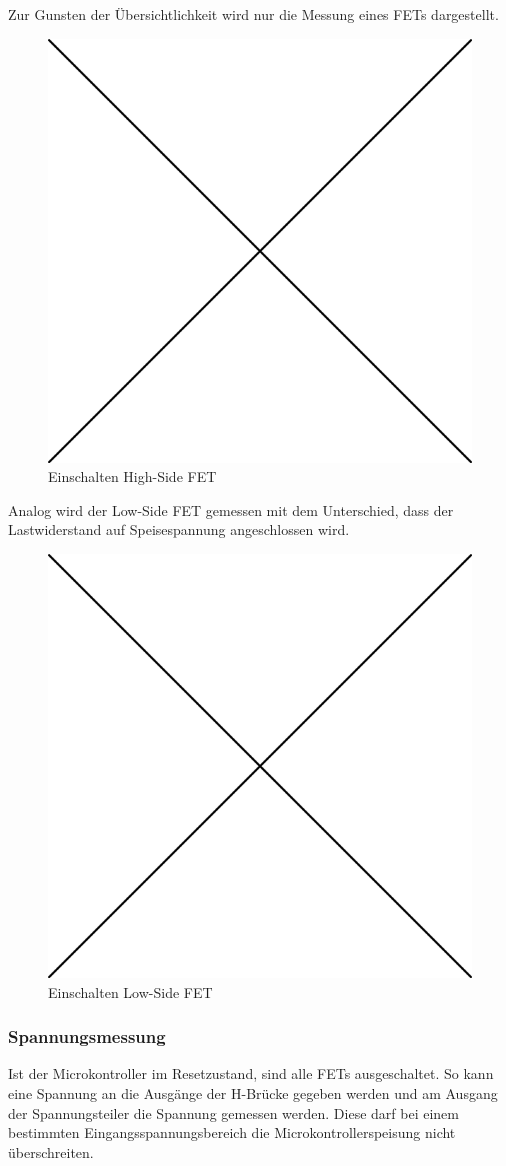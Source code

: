 Zur Gunsten der Übersichtlichkeit wird nur die Messung eines FETs dargestellt.

\begin{figure} [H]
	\centering
	\includegraphics[width=0.5\linewidth]{images/placeholder.png}
	\caption{Einschalten High-Side FET}
	\label{fig:hsfet}
\end{figure}

Analog wird der Low-Side FET gemessen mit dem Unterschied, dass der Lastwiderstand auf Speisespannung angeschlossen wird.

\begin{figure} [H]
	\centering
	\includegraphics[width=0.5\linewidth]{images/placeholder.png}
	\caption{Einschalten Low-Side FET}
	\label{fig:hsfet}
\end{figure}


\subsubsection*{Spannungsmessung}
Ist der Microkontroller im Resetzustand, sind alle FETs ausgeschaltet. So kann eine Spannung an die Ausgänge der H-Brücke gegeben werden und am Ausgang der Spannungsteiler die Spannung gemessen werden. Diese darf bei einem bestimmten Eingangsspannungsbereich die Microkontrollerspeisung nicht überschreiten.

